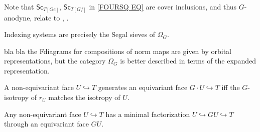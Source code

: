 \documentclass[a4paper,10pt,draft]{article}%
\begin{document}
\begin{remark}
	Note that $\mathsf{Sc}_{T[Ge]}$, $\mathsf{Sc}_{T[Gf]}$
	in \eqref{FOURSQ EQ}
	are cover inclusions, and thus $G$-anodyne, relate to 
	\cite[\S 6.2]{Rez10}, \cite[\S 10]{Rez01}.
\end{remark}


\begin{remark}
Indexing systems are precisely the Segal sieves of $\Omega_G$.
\end{remark}

\begin{remark}
{\color{blue} bla bla} the Fdiagrams for compositions of norm maps are given by orbital representations, but the category $\Omega_G$ is better described in terms of the expanded representation.
\end{remark}




\begin{lemma}
	A non-equivariant face $U \hookrightarrow T$ generates an equivariant face $G\cdot U \hookrightarrow T$ iff the $G$-isotropy of $r_U$ matches the isotropy of $U$.
\end{lemma}






\begin{proposition}
	Any non-equivariant face $U \hookrightarrow T$ has a minimal factorization
	$U \hookrightarrow GU \hookrightarrow T$
	through an equivariant face $GU$.
\end{proposition}
\end{document}
